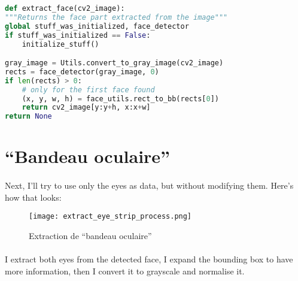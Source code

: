 \begin{lstlisting}[language=Python, caption = Extraction du visage en Python3]
def extract_face(cv2_image):
"""Returns the face part extracted from the image"""
global stuff_was_initialized, face_detector
if stuff_was_initialized == False:
    initialize_stuff()

gray_image = Utils.convert_to_gray_image(cv2_image)
rects = face_detector(gray_image, 0)
if len(rects) > 0:
    # only for the first face found
    (x, y, w, h) = face_utils.rect_to_bb(rects[0])
    return cv2_image[y:y+h, x:x+w]
return None
\end{lstlisting}

\clearpage

\section{``Bandeau oculaire''}
\paragraph{}
Next, I'll try to use only the eyes as data, but without modifying them.
Here's how that looks:

\begin{figure}[H]
    \centering
    \texttt{[image: extract\_eye\_strip\_process.png]}
    \caption{Extraction de ``bandeau oculaire''}
    \label{fig_extracting_eye_strip}
\end{figure}

\paragraph{}
I extract both eyes from the detected face, I expand the bounding box to have more information, then I convert it to grayscale and normalise it.

